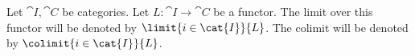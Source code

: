 \begin{notation}
Let $\cat{I},\cat{C}$ be categories.
Let $L: \cat{I} \rightarrow \cat{C}$ be a functor.
The limit over this functor will be denoted by
$\limit{i \in \cat{I}}{L}$.
The colimit will be denoted by
$\colimit{i \in \cat{I}}{L}$.
\end{notation}
